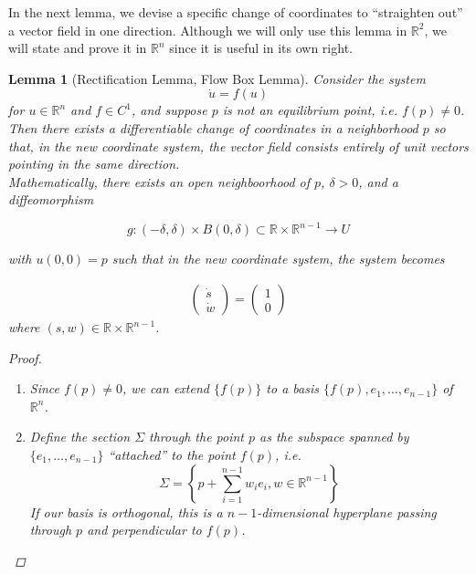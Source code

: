 \documentclass{article}
\newtheorem{lemma}[theorem]{Lemma}
\def\R{{\mathbb R}}
\begin{document}
In the next lemma, we devise a specific change of coordinates to ``straighten out'' a vector field in one direction. Although we will only use this lemma in $\R^2$, we will state and prove it in $\R^n$ since it is useful in its own right.

\begin{lemma}[Rectification Lemma, Flow Box Lemma]
Consider the system
\[
\dot{u} = f(u)
\]
for $u \in \R^n$ and $f \in C^1$, and suppose $p$ is not an equilibrium point, i.e. $f(p) \neq 0$. Then there exists a differentiable change of coordinates in a neighborhood $p$ so that, in the new coordinate system, the vector field consists entirely of unit vectors pointing in the same direction.\\

Mathematically, there exists an open neighboorhood of $p$, $\delta > 0$, and a diffeomorphism 

\[
g: (-\delta, \delta) \times B(0, \delta) \subset \R \times \R^{n-1} \rightarrow U
\]

with $u(0, 0) = p$ such that in the new coordinate system, the system becomes

\begin{align*}
\begin{pmatrix}\dot{s}\\ \dot{w} \end{pmatrix} =
\begin{pmatrix}1\\ 0\end{pmatrix}
\end{align*}
where $(s, w) \in \R \times \R^{n-1}$.

\begin{proof}
\begin{enumerate}
\item Since $f(p) \neq 0$, we can extend $\{ f(p) \}$ to a basis $\{ f(p), e_1, \dots, e_{n-1} \}$ of $\R^n$.
\item Define the section $\Sigma$ through the point $p$ as the subspace spanned by $\{e_1, \dots, e_{n-1} \}$ ``attached'' to the point $f(p)$, i.e.
\[
\Sigma = \left\{ p + \sum_{i=1}^{n-1} w_i e_i, w \in \R^{n-1} \right\}
\]
If our basis is orthogonal, this is a $n-1$-dimensional hyperplane passing through $p$ and perpendicular to $f(p)$.


\end{enumerate}
\end{proof}
\end{lemma}
\end{document}
